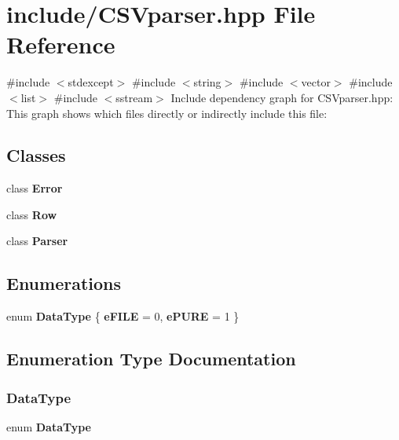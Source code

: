 \section{include/\+C\+S\+Vparser.hpp File Reference}
\label{_c_s_vparser_8hpp}
{\ttfamily \#include $<$stdexcept$>$}\newline
{\ttfamily \#include $<$string$>$}\newline
{\ttfamily \#include $<$vector$>$}\newline
{\ttfamily \#include $<$list$>$}\newline
{\ttfamily \#include $<$sstream$>$}\newline
Include dependency graph for C\+S\+Vparser.\+hpp\+:
This graph shows which files directly or indirectly include this file\+:
\subsection*{Classes}
\begin{DoxyCompactItemize}
\item 
class \textbf{ Error}
\item 
class \textbf{ Row}
\item 
class \textbf{ Parser}
\end{DoxyCompactItemize}
\subsection*{Enumerations}
\begin{DoxyCompactItemize}
\item 
enum \textbf{ Data\+Type} \{ \textbf{ e\+F\+I\+LE} = 0, 
\textbf{ e\+P\+U\+RE} = 1
 \}
\end{DoxyCompactItemize}


\subsection{Enumeration Type Documentation}
\mbox{\label{_c_s_vparser_8hpp_ad8ed01ff3ff33333d8e19db4d2818bb6}} 
\subsubsection{Data\+Type}
{\footnotesize\ttfamily enum \textbf{ Data\+Type}}

